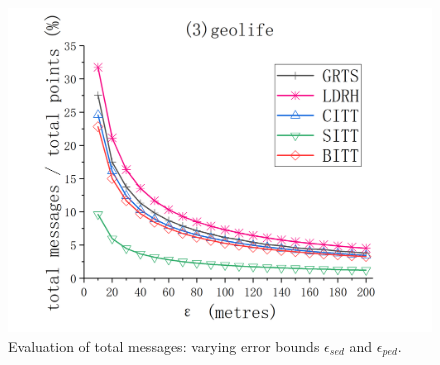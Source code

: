 {\begin{figure}[tb!]
	\includegraphics[scale = 0.580]{figures/Fig-geolife-total-messages.png}\hspace{0ex}
	\vspace{-1ex}
	\caption{\small Evaluation of total messages: varying error bounds $\epsilon_{sed}$ and $\epsilon_{ped}$.}
	\label{fig:total-message}
	\vspace{-1ex}
\end{figure}

}
